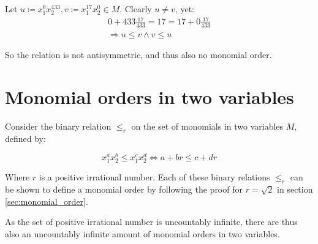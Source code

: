\documentclass[a4paper]{scrreprt}
\begin{document}
Let $u \coloneqq x_1^0 x_2^{433}, v \coloneqq x_1^{17} x_2^0 \in M$. Clearly $u \neq v$, yet:
\begin{align*}
		0 + 433 \frac{17}{433} = 17 = 17 + 0 \frac{17}{433} \\
		\Rightarrow u \leq v \land v \leq u
\end{align*}

So the relation is not antisymmetric, and thus also no monomial order.


\section{Monomial orders in two variables}

Consider the binary relation $\leq_r$ on the set of monomials in two variables
$M$, defined by:

\[
		x_1^a x_2^b \leq x_1^c x_2^d \Leftrightarrow a + br \leq c + dr
\]

Where $r$ is a positive irrational number. Each of these binary relations
$\leq_r$ can be shown to define a monomial order by following the proof for $r
= \sqrt{2}$ in section \ref{sec:monomial_order}.

As the set of positive irrational number is uncountably infinite, there are
thus also an uncountably infinite amount of monomial orders in two variables.

\printbibliography{}
\end{document}

